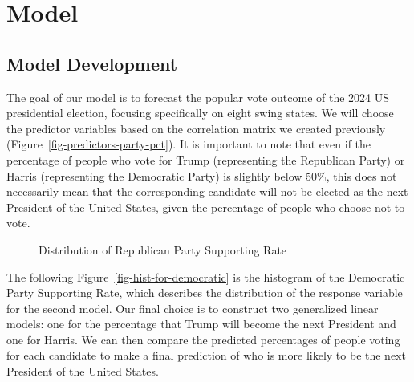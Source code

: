 \documentclass[
  letterpaper,
  DIV=11,
  numbers=noendperiod]{scrartcl}
\begin{document}
\section{Model}\label{sec-model}

\subsection{Model Development}\label{model-development}

The goal of our model is to forecast the popular vote outcome of the
2024 US presidential election, focusing specifically on eight swing
states. We will choose the predictor variables based on the correlation
matrix we created previously (Figure~\ref{fig-predictors-party-pct}). It
is important to note that even if the percentage of people who vote for
Trump (representing the Republican Party) or Harris (representing the
Democratic Party) is slightly below 50\%, this does not necessarily mean
that the corresponding candidate will not be elected as the next
President of the United States, given the percentage of people who
choose not to vote.

\begin{figure}


\caption{\label{fig-hist-for-republican}Distribution of Republican Party
Supporting Rate}

\end{figure}%

The following Figure~\ref{fig-hist-for-democratic} is the histogram of
the Democratic Party Supporting Rate, which describes the distribution
of the response variable for the second model. Our final choice is to
construct two generalized linear models: one for the percentage that
Trump will become the next President and one for Harris. We can then
compare the predicted percentages of people voting for each candidate to
make a final prediction of who is more likely to be the next President
of the United States.
\end{document}
